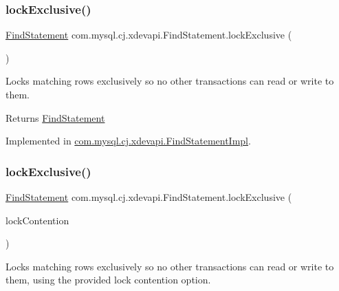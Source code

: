 \subsubsection{\texorpdfstring{lock\+Exclusive()}{lockExclusive()}\hspace{0.1cm}{\footnotesize\ttfamily [1/2]}}
{\footnotesize\ttfamily \mbox{\hyperlink{interfacecom_1_1mysql_1_1cj_1_1xdevapi_1_1_find_statement}{Find\+Statement}} com.\+mysql.\+cj.\+xdevapi.\+Find\+Statement.\+lock\+Exclusive (\begin{DoxyParamCaption}{ }\end{DoxyParamCaption})}

Locks matching rows exclusively so no other transactions can read or write to them.

\begin{DoxyReturn}{Returns}
\mbox{\hyperlink{interfacecom_1_1mysql_1_1cj_1_1xdevapi_1_1_find_statement}{Find\+Statement}} 
\end{DoxyReturn}


Implemented in \mbox{\hyperlink{classcom_1_1mysql_1_1cj_1_1xdevapi_1_1_find_statement_impl_a3486c67a7e4b354ff3101b9c5734c5f1}{com.\+mysql.\+cj.\+xdevapi.\+Find\+Statement\+Impl}}.

\mbox{\label{interfacecom_1_1mysql_1_1cj_1_1xdevapi_1_1_find_statement_a45a87d77da29808cb82617f003de584d}} 
\subsubsection{\texorpdfstring{lock\+Exclusive()}{lockExclusive()}\hspace{0.1cm}{\footnotesize\ttfamily [2/2]}}
{\footnotesize\ttfamily \mbox{\hyperlink{interfacecom_1_1mysql_1_1cj_1_1xdevapi_1_1_find_statement}{Find\+Statement}} com.\+mysql.\+cj.\+xdevapi.\+Find\+Statement.\+lock\+Exclusive (\begin{DoxyParamCaption}\item[{Lock\+Contention}]{lock\+Contention }\end{DoxyParamCaption})}

Locks matching rows exclusively so no other transactions can read or write to them, using the provided lock contention option.


